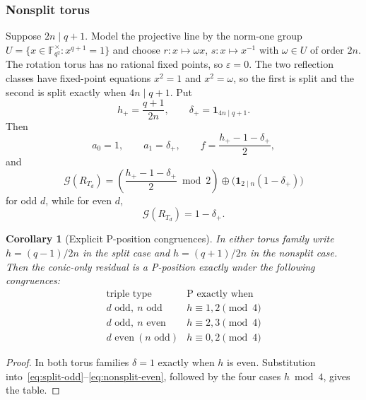 \documentclass[11pt]{article}
\newtheorem{corollary}[theorem]{Corollary}
\theoremstyle{definition}
\theoremstyle{remark}
\newcommand{\F}{\mathbb{F}}
\newcommand{\Grundy}{\mathcal{G}}
\begin{document}
\subsubsection*{Nonsplit torus}

Suppose $2n\mid q+1$. Model the projective line by the norm-one group
$U=\{x\in\F_{q^2}^\times : x^{q+1}=1\}$ and choose $r:x\mapsto\omega x$, $s:x\mapsto x^{-1}$ with
$\omega\in U$ of order $2n$. The rotation torus has no rational fixed points, so $\varepsilon=0$.
The two reflection classes have fixed-point equations $x^2=1$ and $x^2=\omega$, so the first is
split and the second is split exactly when $4n\mid q+1$. Put
\[
  h_+=\frac{q+1}{2n},\qquad \delta_+=\mathbf 1_{4n\mid q+1}.
\]
Then
\begin{equation}
  a_0=1,\qquad a_1=\delta_+,\qquad f=\frac{h_+-1-\delta_+}{2},
  \label{eq:nonsplit-orbits}
\end{equation}
and
\begin{equation}
  \Grundy(R_{T_d})
  =\left(\frac{h_+-1-\delta_+}{2}\bmod 2\right)\oplus\bigl(\mathbf 1_{2\mid n}(1-\delta_+)\bigr)
  \label{eq:nonsplit-odd}
\end{equation}
for odd $d$, while for even $d$,
\begin{equation}
  \Grundy(R_{T_d})=1-\delta_+ .
  \label{eq:nonsplit-even}
\end{equation}

\begin{corollary}[Explicit P-position congruences]
\label{cor:pn-congruences}
In either torus family write $h=(q-1)/2n$ in the split case and $h=(q+1)/2n$ in the nonsplit case.
Then the conic-only residual is a P-position exactly under the following congruences:
\begin{equation}
  \begin{array}{c|c}
    \text{triple type} & \text{P exactly when}\\
    \hline
    d\text{ odd},\ n\text{ odd} & h\equiv1,2\pmod 4\\
    d\text{ odd},\ n\text{ even} & h\equiv2,3\pmod 4\\
    d\text{ even}\ (n\text{ odd}) & h\equiv0,2\pmod 4
  \end{array}
  \label{eq:pn-table}
\end{equation}
\end{corollary}

\begin{proof}
In both torus families $\delta=1$ exactly when $h$ is even. Substitution
into~\eqref{eq:split-odd}--\eqref{eq:nonsplit-even}, followed by the four cases $h\bmod4$, gives the
table.
\end{proof}
\end{document}
